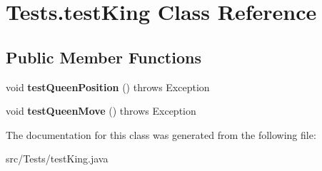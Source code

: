 \hypertarget{class_tests_1_1test_king}{}\section{Tests.\+test\+King Class Reference}
\label{class_tests_1_1test_king}
\subsection*{Public Member Functions}
\begin{DoxyCompactItemize}
\item 
\mbox{\label{class_tests_1_1test_king_a953ac02e44371b92c22581cca98c7b6a}} 
void {\bfseries test\+Queen\+Position} ()  throws Exception
\item 
\mbox{\label{class_tests_1_1test_king_a69cd37fd741d302edd3335819656cb5d}} 
void {\bfseries test\+Queen\+Move} ()  throws Exception
\end{DoxyCompactItemize}


The documentation for this class was generated from the following file\+:\begin{DoxyCompactItemize}
\item 
src/\+Tests/test\+King.\+java\end{DoxyCompactItemize}
